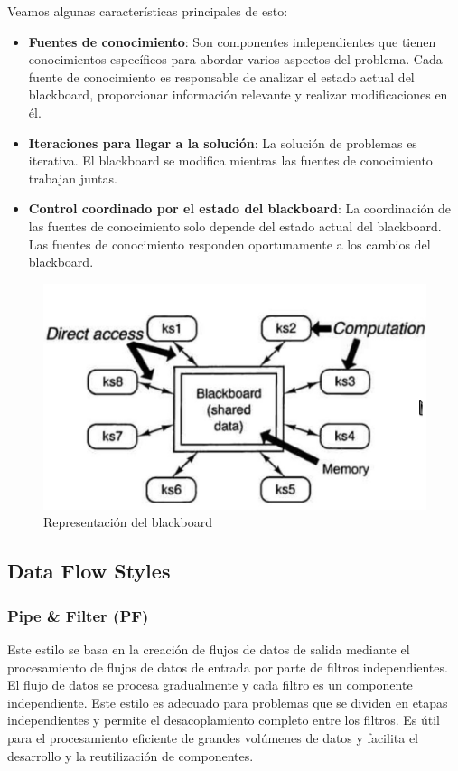 \documentclass{article}
\begin{document}
			Veamos algunas características principales de esto: 
			\begin{itemize}	
				\item {\textbf{Fuentes de conocimiento}}: Son componentes independientes que tienen conocimientos específicos para abordar varios aspectos del problema. Cada fuente de conocimiento es responsable de analizar el estado actual del blackboard, proporcionar información relevante y realizar modificaciones en él.
				
				\item {\textbf{Iteraciones para llegar a la solución}}: La solución de problemas es iterativa. El blackboard se modifica mientras las fuentes de conocimiento trabajan juntas.
				
				\item {\textbf{Control coordinado por el estado del blackboard}}: La coordinación de las fuentes de conocimiento solo depende del estado actual del blackboard. Las fuentes de conocimiento responden oportunamente a los cambios del blackboard.
				
				
			\end{itemize}
				\begin{figure}[h]
					\centering
					\includegraphics[width=1\textwidth]{blackboard.png}
					\caption{Representación del blackboard}
				\end{figure}
		
		\subsection{Data Flow Styles}
			\subsubsection{Pipe \& Filter (PF)}
			Este estilo se basa en la creación de flujos de datos de salida mediante el procesamiento de flujos de datos de entrada por parte de filtros independientes. El flujo de datos se procesa gradualmente y cada filtro es un componente independiente. Este estilo es adecuado para problemas que se dividen en etapas independientes y permite el desacoplamiento completo entre los filtros. Es útil para el procesamiento eficiente de grandes volúmenes de datos y facilita el desarrollo y la reutilización de componentes.
			
\end{document}
